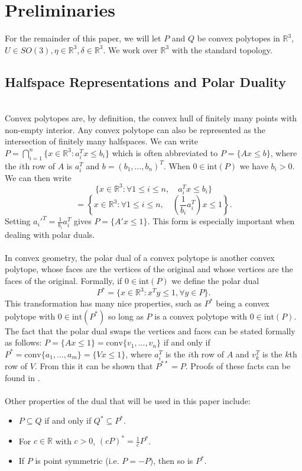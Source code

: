 \documentclass[a4paper]{amsart}
\theoremstyle{remark}
\begin{document}
\section{Preliminaries} \label{sec:preliminaries}
For the remainder of this paper, we will let $P$ and $Q$ be convex polytopes in $\mathbb{R}^3$, $U\in SO(3),\eta\in\mathbb{R}^3,\delta\in\mathbb{R}^3$. We work over $\mathbb{R}^3$ with the standard topology.
\\
\subsection{Halfspace Representations and Polar Duality}
\hfill \\
Convex polytopes are, by definition, the convex hull of finitely many points with non-empty interior. Any convex polytope can also be represented as the intersection of finitely many halfspaces. We can write $P=\bigcap_{i=1}^n\{x\in\mathbb{R}^3: a_i^Tx\leq b_i\}$ which is often abbreviated to $P=\{Ax\leq b\}$, where the $i$th row of $A$ is $a_i^T$ and $b=(b_1,...,b_n)^T$. When $0\in \textrm{int}(P)$ we have $b_i>0$. We can then write 
$$\{x\in\mathbb{R}^3: \forall 1 \leq i \leq n, \quad a_i^Tx\leq b_i \}$$  
$$=\left\{x\in\mathbb{R}^3: \forall 1 \leq i \leq n, \quad \left(\frac{1}{b_i}a_i^T \right)x\leq 1 \right\}.$$
Setting $a_i'^T=\frac{1}{b_i}a_i^T$ gives $P=\{A'x\leq 1\}$. This form is especially important when dealing with polar duals.
\\\\
In convex geometry, the polar dual of a convex polytope is another convex polytope, whose faces are the vertices of the original and whose vertices are the faces of the original. Formally, if $0\in \textrm{int}(P)$ we define the polar dual
$$P^*=\{x\in\mathbb{R}^3:x^Ty\leq1,\forall y\in P\}.$$
This transformation has many nice properties, such as $P^*$ being a convex polytope with $0\in \textrm{int}(P^*)$ so long as $P$ is a convex polytope with $0\in \textrm{int}(P)$. The fact that the polar dual swaps the vertices and faces can be stated formally as follows: $P=\{Ax\leq1\}=\textrm{conv}\{v_1,...,v_n\}$ if and only if $P^*=\textrm{conv}\{a_1,...,a_m\}=\{Vx\leq1\}$, where $a_i^T$ is the $i$th row of $A$ and $v_k^T$ is the $k$th row of $V$. From this it can be shown that $P^{**}=P$. Proofs of these facts can be found in \cite{Ga07}.
\\\\
Other properties of the dual that will be used in this paper include:
\begin{itemize}
	\item $P\subseteq Q$ if and only if $Q^*\subseteq P^*$.
	\item For $c \in \mathbb{R}$ with $c > 0$, $(cP)^*=\frac{1}{c}P^*$.
	\item If $P$ is point symmetric (i.e. $P=-P$), then so is $P^*$.
\end{itemize}
\hfill
\end{document}
